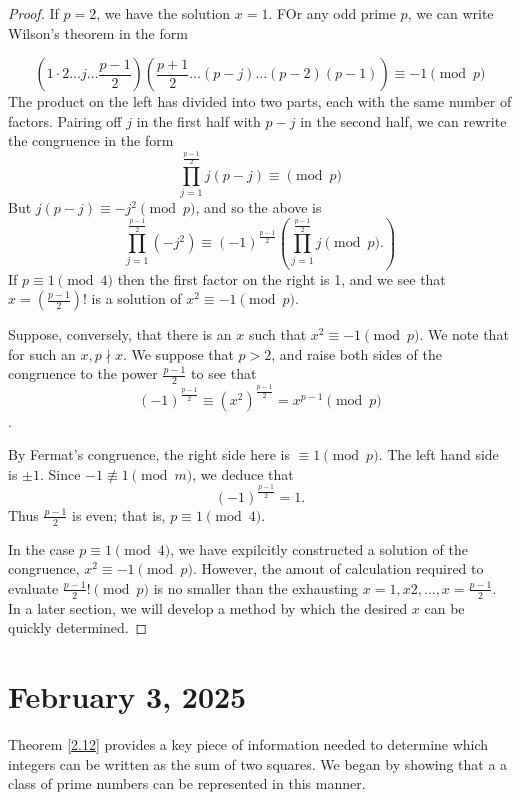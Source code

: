\documentclass[11pt]{article}
\begin{document}
\begin{proof}
    If \(p = 2\), we have the solution \(x = 1\). FOr any odd prime \(p\), we can write Wilson's theorem in the form

    \[\left(1 \cdot 2 \ldots j \ldots \frac{p - 1}{2}\right)\left(\frac{p + 1}{2} \ldots (p - j) \ldots (p - 2)(p - 1)\right) \equiv -1 \pmod{p}\]
    The product on the left has divided into two parts, each with the same number
    of factors. Pairing off \(j\) in the first half with \(p - j\) in the second
    half, we can rewrite the congruence in the form
    \[\prod_{j = 1}^{\frac{p - 1}{2}} j (p - j)\equiv \pmod{p}\]
    But \(j(p - j) \equiv -j^2 \pmod{p}\), and so the above is
    \[\prod_{j = 1}^{\frac{p - 1}{2}}(-j^2) \equiv (-1)^{\frac{p - 1}{2}}\left(\prod_{j = 1}^{\frac{p - 1}{2}} j \pmod{p}.\right)\]
    If \(p \equiv 1 \pmod{4}\) then the first factor on the right is 1, and we see
    that \(x = \left(\frac{p - 1}{2}\right)!\) is a solution of \(x^2 \equiv -1
    \pmod{p}\).

    Suppose, conversely, that there is an \(x\) such that \(x^2 \equiv -1
    \pmod{p}\). We note that for such an \(x, p \nmid x\). We suppose that \(p >
    2\), and raise both sides of the congruence to the power \(\frac{p - 1}{2}\) to
    see that
    \[(-1)^\frac{p - 1}{2} \equiv (x^2)^{\frac{ p - 1}{2}} = x^{p - 1} \pmod{p}\].

    By Fermat's congruence, the right side here is \(\equiv 1 \pmod{p}\). The left
    hand side is \(\pm 1\). Since \(-1 \not \equiv 1 \pmod{m}\), we deduce that \[(-1)^{\frac{p - 1}{2}} = 1.\] Thus \(\frac{p - 1}{2}\) is even; that is, \(p \equiv 1 \pmod{4}\).

    In the case \(p \equiv 1 \pmod {4}\), we have expilcitly constructed a solution
    of the congruence, \(x^2 \equiv -1 \pmod{p}\). However, the amout of
    calculation required to evaluate \(\frac{p - 1}{2}! \pmod{p}\) is no smaller
    than the exhausting \(x = 1, x 2, \ldots, x = \frac{p - 1}{2}\). In a later
    section, we will develop a method by which the desired \(x\) can be quickly
    determined.
\end{proof}


\section{February 3, 2025}

Theorem \ref{2.12} provides a key piece of information needed to determine
which integers can be written as the sum of two squares. We began by showing
that a a class of prime numbers can be represented in this manner.
\end{document}
